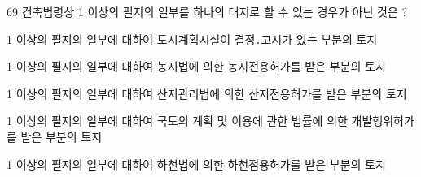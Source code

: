 \begin{question}{69}
건축법령상 1 이상의 필지의 일부를 하나의 대지로 할 수 있는 경우가 아닌 것은 ?
\begin{choices}
  \item 1 이상의 필지의 일부에 대하여 도시계획시설이 결정․고시가 있는 부분의 토지
  \item 1 이상의 필지의 일부에 대하여 농지법에 의한 농지전용허가를 받은 부분의 토지
  \item 1 이상의 필지의 일부에 대하여 산지관리법에 의한 산지전용허가를 받은 부분의 토지
  \item 1 이상의 필지의 일부에 대하여 국토의 계획 및 이용에 관한 법률에 의한 개발행위허가를 받은 부분의 토지
  \item 1 이상의 필지의 일부에 대하여 하천법에 의한 하천점용허가를 받은 부분의 토지
\end{choices}
\end{question}
